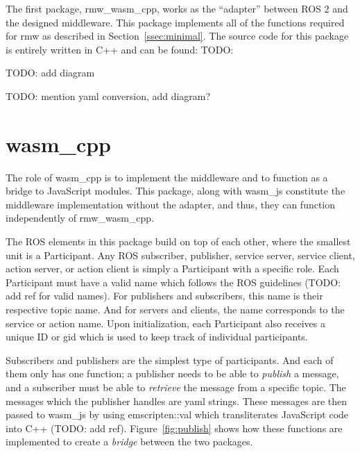         The first package, \textsf{rmw\_wasm\_cpp}, works as the ``adapter'' between \ac{ROS} 2 and the designed middleware. This package implements all of the functions required for \textsf{rmw} as described in Section~\ref{ssec:minimal}. The source code for this package is entirely written in C++ and can be found: TODO: 

        TODO: add diagram

        TODO: mention yaml conversion, add diagram?

    \section{wasm\_cpp}

        The role of \textsf{wasm\_cpp} is to implement the middleware and to function as a bridge to JavaScript modules. This package, along with \textsf{wasm\_js} constitute the middleware implementation without the adapter, and thus, they can function independently of \textsf{rmw\_wasm\_cpp}. 

        The \ac{ROS} elements in this package build on top of each other, where the smallest unit is a \textsf{Participant}. Any \ac{ROS} subscriber, publisher, service server, service client, action server, or action client is simply a \textsf{Participant} with a specific role. Each \textsf{Participant} must have a valid name which follows the \ac{ROS} guidelines (TODO: add ref for valid names). For publishers and subscribers, this name is their respective topic name. And for servers and clients, the name corresponds to the service or action name.  Upon initialization, each \textsf{Participant} also receives a unique ID or \textsf{gid} which is used to keep track of individual participants. 

        Subscribers and publishers are the simplest type of participants. And each of them only has one function; a publisher needs to be able to \textit{publish} a message, and a subscriber must be able to \textit{retrieve} the message from a specific topic. The messages which the publisher handles are yaml strings. These messages are then passed to \textsf{wasm\_js} by using \textsf{emscripten::val} which transliterates JavaScript code into C++ (TODO: add ref). Figure~\ref{fig:publish} shows how these functions are implemented to create a \textit{bridge} between the two packages.

